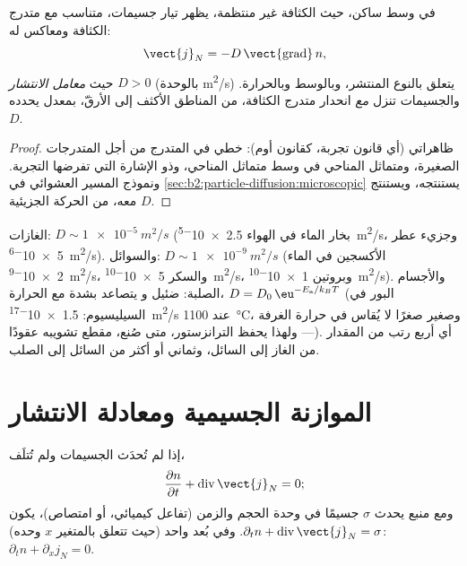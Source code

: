 \begin{theorem}\label{thm:b2:particle-diffusion:fick}
في وسط ساكن، حيث الكثافة غير منتظمة، يظهر تيار
جسيمات، متناسب مع متدرج الكثافة ومعاكس
له:
\[
\vect{j}_N = -D\,\vect{\operatorname{grad}}\,n ,
\]
حيث \emph{معامل الانتشار}
$D > 0$ (بالوحدة \unit{m^2/s}) يتعلق بالنوع المنتشر، وبالوسط
وبالحرارة. والجسيمات تنزل \emph{مع} انحدار متدرج الكثافة،
من المناطق الأكثف إلى الأرقّ، بمعدل يحدده $D$.
\end{theorem}

\begin{proof}
ظاهراتي (أي قانون تجربة، كقانون أوم): خطي في
المتدرج من أجل المتدرجات الصغيرة، ومتماثل المناحي في وسط متماثل المناحي، وذو
الإشارة التي تفرضها التجربة. ونموذج المسير العشوائي في
\cref{sec:b2:particle-diffusion:microscopic} يستنتجه، ويستنتج $D$ معه،
من الحركة الجزيئية.
\end{proof}

\begin{example}\label{ex:b2:particle-diffusion:orders}
الغازات: $D \sim \qty{1e-5}{m^2/s}$ (بخار الماء في الهواء
\qty{2.5e-5}{m^2/s}، وجزيء عطر \qty{5e-6}{m^2/s}). والسوائل:
$D \sim \qty{1e-9}{m^2/s}$ (الأكسجين في الماء \qty{2e-9}{m^2/s}، والسكر
\qty{5e-10}{m^2/s}، وبروتين \qty{1e-10}{m^2/s}). والأجسام الصلبة: ضئيل و
يتصاعد بشدة مع الحرارة، $D = D_0\,\eu^{-E_{\text{a}}/k_BT}$
(البور في السيليسيوم: \qty{1.5e-17}{m^2/s} عند \qty{1100}{\celsius}،
وصغير صغرًا لا يُقاس في حرارة الغرفة --- ولهذا يحفظ الترانزستور،
متى صُنع، مقطع تشويبه عقودًا). أي أربع رتب من
المقدار من الغاز إلى السائل، وثماني أو أكثر من السائل إلى الصلب.
\end{example}

\section{الموازنة الجسيمية ومعادلة الانتشار}

\begin{theorem}\label{thm:b2:particle-diffusion:balance}
إذا لم تُحدَث الجسيمات ولم تُتلَف،
\[
\frac{\partial n}{\partial t} + \operatorname{div}\vect{j}_N = 0 ;
\]
ومع منبع يحدث $\sigma$ جسيمًا في وحدة الحجم والزمن
(تفاعل كيميائي، أو امتصاص)، يكون $\partial_t n +
\operatorname{div}\vect{j}_N = \sigma$. وفي بُعد واحد (حيث تتعلق  بالمتغير $x$ وحده): $\partial_t n + \partial_x j_N = 0$.
\end{theorem}

